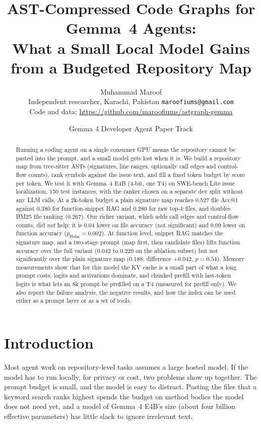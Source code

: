 \documentclass[10pt]{article}
\title{AST-Compressed Code Graphs for Gemma~4 Agents:\\ What a Small Local Model Gains from a Budgeted Repository Map}
\author{Muhammad Maroof\\ \small Independent researcher, Karachi, Pakistan \;\;\texttt{maroofiums@gmail.com}\\
\small Code and data: \url{https://github.com/maroofiums/astgraph-gemma}}
\date{Gemma 4 Developer Agent Paper Track}
\begin{document}
\maketitle

\begin{abstract}
\noindent Running a coding agent on a single consumer GPU means the repository cannot be pasted into the prompt, and a small model gets lost when it is. We build a repository map from tree-sitter ASTs (signatures, line ranges, optionally call edges and control-flow counts), rank symbols against the issue text, and fill a fixed token budget by score per token. We test it with Gemma~4 E4B (4-bit, one T4) on SWE-bench Lite issue localization, 150 test instances, with the ranker chosen on a separate dev split without any LLM calls. At a 2k-token budget a plain signature map reaches 0.527 file Acc@1 against 0.380 for function-snippet RAG and 0.280 for raw top-$k$ files, and doubles BM25 file ranking (0.267). Our richer variant, which adds call edges and control-flow counts, did \emph{not} help: it is 0.04 lower on file accuracy (not significant) and 0.09 lower on function accuracy ($p_{\text{Holm}}=0.002$). At function level, snippet RAG matches the signature map, and a two-stage prompt (map first, then candidate files) lifts function accuracy over the full variant (0.042 to 0.229 on the ablation subset) but not significantly over the plain signature map (0.188; difference $+0.042$, $p=0.54$). Memory measurements show that for this model the KV cache is a small part of what a long prompt costs; logits and activations dominate, and chunked prefill with last-token logits is what lets an 8k prompt be prefilled on a T4 (measured for prefill only). We also report the failure analysis, the negative results, and how the index can be used either as a prompt layer or as a set of tools.
\end{abstract}

\section{Introduction}
Most agent work on repository-level tasks assumes a large hosted model. If the model has to run locally, for privacy or cost, two problems show up together. The prompt budget is small, and the model is easy to distract. Pasting the files that a keyword search ranks highest spends the budget on method bodies the model does not need yet, and a model of Gemma~4 E4B's size (about four billion effective parameters) has little slack to ignore irrelevant text.
\end{document}
